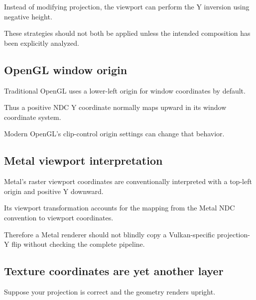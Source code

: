 \hypertarget{02-foundations-ii-ch033-alternative-negative-vulkan-viewport-height}{}

Instead of modifying projection, the viewport can perform the Y inversion using negative height.

These strategies should not both be applied unless the intended composition has been explicitly analyzed.

\subsection{OpenGL window origin}\label{02-foundations-ii-ch033-opengl-window-origin}

\hypertarget{02-foundations-ii-ch033-opengl-window-origin}{}

Traditional OpenGL uses a lower-left origin for window coordinates by default.

Thus a positive NDC Y coordinate normally maps upward in its window coordinate system.

Modern OpenGL's clip-control origin settings can change that behavior.

\subsection{Metal viewport interpretation}\label{02-foundations-ii-ch033-metal-viewport-interpretation}

\hypertarget{02-foundations-ii-ch033-metal-viewport-interpretation}{}

Metal's raster viewport coordinates are conventionally interpreted with a top-left origin and positive Y downward.

Its viewport transformation accounts for the mapping from the Metal NDC convention to viewport coordinates.

Therefore a Metal renderer should not blindly copy a Vulkan-specific projection-Y flip without checking the complete pipeline.

\subsection{Texture coordinates are yet another layer}\label{02-foundations-ii-ch033-texture-coordinates-are-yet-another-layer}

\hypertarget{02-foundations-ii-ch033-texture-coordinates-are-yet-another-layer}{}

Suppose your projection is correct and the geometry renders upright.

